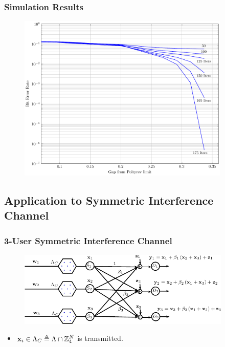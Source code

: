 \documentclass[10pt]{beamer}
\begin{document}
\begin{frame}\frametitle{Simulation Results}

\begin{figure}
\begin{center}
\includegraphics[width=0.9\textwidth]{BER_iters_4_72_9.pdf}
\end{center}
\end{figure}
\end{frame}

\subsection{Application to Symmetric Interference Channel}
\begin{frame}\frametitle{3-User Symmetric Interference Channel}
	\begin{figure}
	\centering
    \includegraphics[width=4in]{IC_model_ISIT_3user.pdf}
	\end{figure}
\pause
\begin{itemize}
\item $\mathbf{x}_{i}\in \Lambda_{C}\triangleq \Lambda \cap \mathbb{Z}_{4}^{N}$ is transmitted.
\vspace{0.2in}
\end{itemize}
\end{frame}
\end{document}
